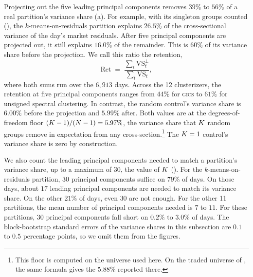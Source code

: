 Projecting out the five leading principal components removes $39\%$ to $56\%$ of a real partition's variance share (a). For example, with its singleton groups counted (), the $k$-means-on-residuals partition explains $26.5\%$ of the cross-sectional variance of the day's market residuals.
After five principal components are projected out, it still explains $16.0\%$ of the remainder. This is $60\%$ of its variance share before the projection. We call this ratio the retention,
%
\begin{equation}\label{eq:retention}
  \mathrm{Ret} \;=\; \frac{\sum_t \mathrm{VS}_t^{\perp}}{\sum_t \mathrm{VS}_t},
\end{equation}
%
where both sums run over the $6{,}913$ days. Across the 12
clusterizers, the retention at five principal components ranges from $44\%$ for
\textsc{gics} to $61\%$ for unsigned spectral clustering. In contrast, the random control's variance share is $6.00\%$ before the projection and $5.99\%$ after. Both values are at the degrees-of-freedom floor $(K-1)/(N-1) = 5.97\%$, the variance share that $K$ random groups remove in expectation from any cross-section.\footnote{This floor is computed on the universe used here. On the traded universe of , the same formula gives the $5.88\%$ reported there.} The $K=1$ control's variance share is zero by
construction.

We also count the leading principal components needed to match a partition's variance share, up to a maximum of $30$, the value of $K$ (). For the $k$-means-on-residuals partition, $30$ principal components suffice on $79\%$ of days. On those days, about $17$ leading principal components are needed to match its variance share. On the other $21\%$ of days, even $30$ are not enough. For the other 11 partitions, the mean number of principal components needed is $7$ to $11$. For these partitions, $30$ principal components fall short on $0.2\%$ to $3.0\%$ of days. The block-bootstrap standard errors of the variance shares in this subsection are $0.1$ to $0.5$ percentage points, so we omit them from the figures.

